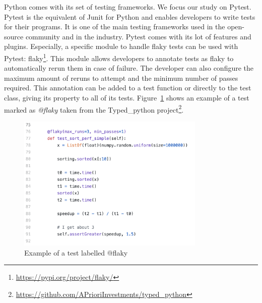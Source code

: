 Python comes with its set of testing frameworks. 
We focus our study on Pytest\cite{pytestdocumentation}. Pytest is the equivalent of Junit for Python and enables developers to write tests for their programs. It is one of the main testing frameworks used in the open-source community and in the industry.
Pytest comes with its lot of features and plugins. Especially, a specific module to handle flaky tests can be used with Pytest: flaky\footnote{\url{https://pypi.org/project/flaky/}}.  
This module allows developers to annotate tests as flaky to automatically rerun them in case of failure. 
The developer can also configure the maximum amount of reruns to attempt and the minimum number of passes required. 
This annotation can be added to a test function or directly to the test class, giving its property to all of its tests. 
Figure~\ref{flaky-example} shows an example of a test marked as \emph{@flaky} taken from the Typed\_python project\footnote{\url{https://github.com/APrioriInvestments/typed\_python}}.

\begin{figure}[ht]
\centering
\includegraphics[width=0.8\textwidth]{figures/replication/flakyExample.png}
\caption{Example of a test labelled @flaky}
\label{flaky-example}
\end{figure}

